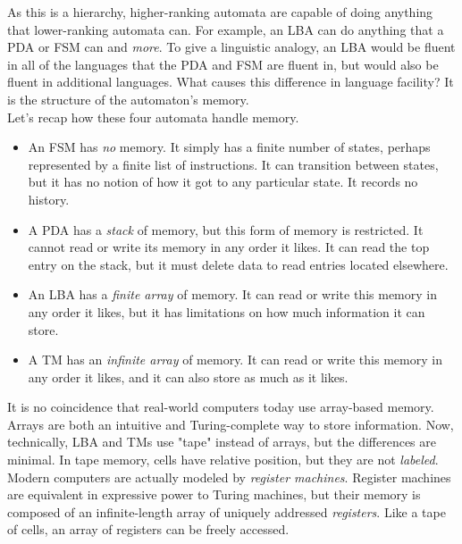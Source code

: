 As this is a hierarchy, higher-ranking automata are capable of doing anything that lower-ranking automata can. For example, an LBA can do anything that a PDA or FSM can and \textit{more}. To give a linguistic analogy, an LBA would be fluent in all of the languages that the PDA and FSM are fluent in, but would also be fluent in additional languages. What causes this difference in language facility? It is the structure of the automaton's memory. \\

Let's recap how these four automata handle memory.

\begin{itemize}
	\item An FSM has \textit{no} memory. It simply has a finite number of states, perhaps represented by a finite list of instructions. It can transition between states, but it has no notion of how it got to any particular state. It records no history.
	\item A PDA has a \textit{stack} of memory, but this form of memory is restricted. It cannot read or write its memory in any order it likes. It can read the top entry on the stack, but it must delete data to read entries located elsewhere.
	\item An LBA has a \textit{finite array} of memory. It can read or write this memory in any order it likes, but it has limitations on how much information it can store.
	\item A TM has an \textit{infinite array} of memory. It can read or write this memory in any order it likes, and it can also store as much as it likes.
\end{itemize}

It is no coincidence that real-world computers today use array-based memory. Arrays are both an intuitive and Turing-complete way to store information. Now, technically, LBA and TMs use "tape" instead of arrays, but the differences are minimal. In tape memory, cells have relative position, but they are not \textit{labeled}. Modern computers are actually modeled by \textit{register machines}. Register machines are equivalent in expressive power to Turing machines, but their memory is composed of an infinite-length array of uniquely addressed \textit{registers}. Like a tape of cells, an array of registers can be freely accessed. \\

